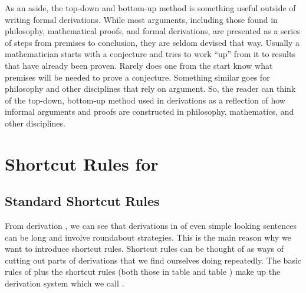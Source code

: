 As an aside, the top-down and bottom-up method is something useful outside of writing formal derivations. While most arguments, including those found in philosophy, mathematical proofs, and formal derivations, are presented as a series of steps from premises to conclusion, they are seldom devised that way. Usually a mathematician starts with a conjecture and tries to work ``up'' from it to results that have already been proven. Rarely does one from the start know what premises will be needed to prove a conjecture. Something similar goes for philosophy and other disciplines that rely on argument. So, the reader can think of the top-down, bottom-up method used in derivations as a reflection of how informal arguments and proofs are constructed in philosophy, mathematics, and other disciplines.

\section{Shortcut Rules for \GSD{}}

\subsection{Standard Shortcut Rules}\label{Standard Shortcut Rules GSD}
From derivation , we can see that derivations in \GSD{} of even simple looking sentences can be long and involve roundabout strategies. 
This is the main reason why we want to introduce shortcut rules. 
Shortcut rules can be thought of as ways of cutting out parts of derivations that we find ourselves doing repeatedly. 
The basic rules of \GSD{} plus the shortcut rules (both those in table  and table ) make up the derivation system which we call \GSDP{}.

